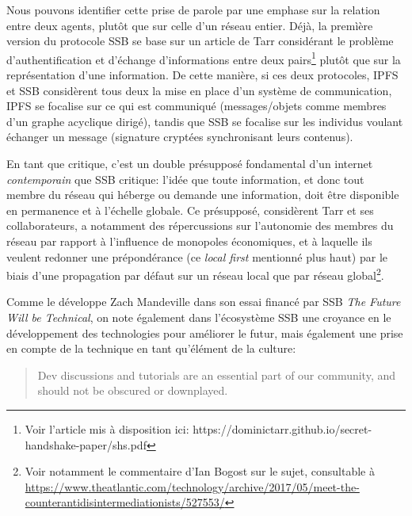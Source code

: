 \documentclass{article}
\begin{document}
Nous pouvons identifier cette prise de parole par une emphase sur la relation entre deux agents, plutôt que sur celle d'un réseau entier. Déjà, la premìère version du protocole SSB se base sur un article de Tarr considérant le problème d'authentification et d'échange d'informations entre deux pairs\footnote{Voir l'article mis à disposition ici: https://dominictarr.github.io/secret-handshake-paper/shs.pdf} plutôt que sur la représentation d'une information. De cette manière, si ces deux protocoles, IPFS et SSB considèrent tous deux la mise en place d'un système de communication, IPFS se focalise sur ce qui est communiqué (messages/objets comme membres d'un graphe acyclique dirigé), tandis que SSB se focalise sur les individus voulant échanger un message (signature cryptées synchronisant leurs contenus).

En tant que critique, c'est un double présupposé fondamental d'un internet \emph{contemporain} que SSB critique: l'idée que toute information, et donc tout membre du réseau qui héberge ou demande une information, doit être disponible en permanence et à l'échelle globale. Ce présupposé, considèrent Tarr et ses collaborateurs, a notamment des répercussions sur l'autonomie des membres du réseau par rapport à l'influence de monopoles économiques, et à laquelle ils veulent redonner une prépondérance (ce \emph{local first} mentionné plus haut) par le biais d'une propagation par défaut sur un réseau local que par réseau global\footnote{Voir notamment le commentaire d'Ian Bogost sur le sujet, consultable à \url{https://www.theatlantic.com/technology/archive/2017/05/meet-the-counterantidisintermediationists/527553/}}.

Comme le développe Zach Mandeville dans son essai financé par SSB \emph{The Future Will be Technical}, on note également dans l'écosystème SSB une croyance en le développement des technologies pour améliorer le futur, mais également une prise en compte de la technique en tant qu'élément de la culture:

\begin{quote}
    Dev discussions and tutorials are an essential part of our community, and should not be obscured or downplayed\cite{mandeville_future_nodate}.
\end{quote}
\end{document}

